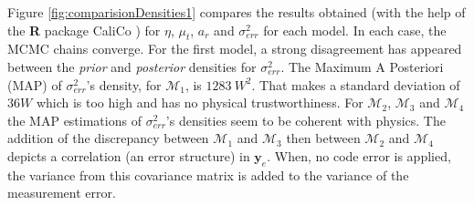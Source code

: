 \documentclass[soumission]{jsfds}
\begin{document}
Figure \ref{fig:comparisionDensities1} compares the results obtained (with the help of the \textbf{R} package CaliCo \citep{CaliCo}) 
for $\eta$, $\mu_t$, $a_r$ and $\sigma_{err}^2$ for each model. In each case, the MCMC chains converge. 
For the first model, a strong disagreement has appeared between the \textit{prior} and \textit{posterior} densities for $\sigma_{err}^2$. 
The Maximum A Posteriori (MAP) of $\sigma_{err}^2$'s density, for $\mathcal{M}_1$,
 is $1283\ W^2$. That makes a standard deviation of $36W$ which is too high and has no physical trustworthiness. 
For $\mathcal{M}_2$, $\mathcal{M}_3$ and $\mathcal{M}_4$ the MAP estimations of $\sigma_{err}^2$'s densities seem to be coherent with physics. The addition of the discrepancy between $\mathcal{M}_1$ and $\mathcal{M}_3$ then between $\mathcal{M}_2$ and $\mathcal{M}_4$ depicts a correlation (an error structure) in $\boldsymbol{y}_e$. When, no code error is applied, the variance from this covariance matrix is added to the variance of the measurement error. \newline

 
\end{document}
